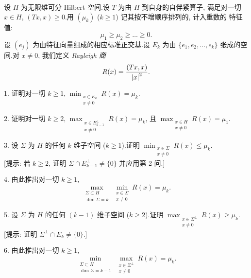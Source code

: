 \begin{problem}
\label{prob:37}
设 $H$ 为无限维可分 Hilbert 空间.设 $T$ 为由 $H$ 到自身的自伴紧算子, 满足对一切
$x\in H$, $(Tx,x)\ge0$.用 $(\mu_k)$ ($k\ge1$) 记其按不增顺序排列的, 计入重数的
特征值:
\begin{equation*}
\mu_1\ge\mu_2\ge\dots\ge0.
\end{equation*}
设 $(e_j)$ 为由特征向量组成的相应标准正交基.设 $E_k$ 为由 $\{e_1,e_2,\dots,e_k\}$
张成的空间.对 $x\ne0$, 我们定义 \emph{Rayleigh 商}
\begin{equation*}
R(x)=\frac{(Tx,x)}{\left|x\right|^2}.
\end{equation*}

1. 证明对一切 $k\ge1$, $\min_{\substack{x\in E_k\\x\ne0}}R(x)=\mu_k$.

2. 证明对一切 $k\ge2$, $\max_{\substack{x\in E_{k-1}^\perp\\x\ne0}}R(x)=\mu_k$,
且 $\max_{\substack{x\in H\\x\ne0}}R(x)=\mu_1$.

3. 设 $\Sigma$ 为 $H$ 的任何 $k$ 维子空间 ($k\ge1$).证明
$\min_{\substack{x\in\Sigma\\x\ne0}}R(x)\le\mu_k$.\\
{[提示: 若 $k\ge2$, 证明 $\Sigma\cap E_{k-1}^\perp\ne\{0\}$ 并应用第 2 问.]}

4. 由此推出对一切 $k\ge1$,
\begin{equation*}
\max_{\substack{\Sigma\subset H\\\dim\Sigma=k}}\min_{\substack{x\in\Sigma\\x\ne0}}R(x)=\mu_k.
\end{equation*}

5. 设 $\Sigma$ 为 $H$ 的任何 $(k-1)$ 维子空间 ($k\ge2$).证明
$\max_{\substack{x\in\Sigma^\perp\\x\ne0}}R(x)\ge\mu_k$.\\
{[提示: 证明 $\Sigma^\perp\cap E_k\ne\{0\}$.]}

6. 由此推出对一切 $k\ge1$,
\begin{equation*}
\min_{\substack{\Sigma\subset H\\\dim\Sigma=k-1}}\max_{\substack{x\in\Sigma^\perp\\x\ne0}}R(x)=\mu_k.
\end{equation*}


\end{problem}
